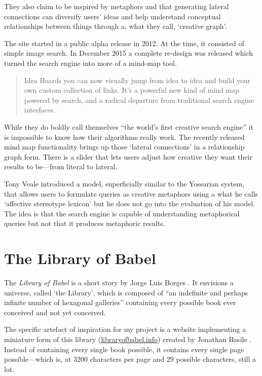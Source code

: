 They also claim to be inspired by metaphors and that generating lateral connections can diversify users' ideas and help understand conceptual relationships between things through a, what they call, `creative graph'.

The site started in a public alpha release in 2012. At the time, it consisted of simple image search. In December 2015 a complete re-design was released \autocite{YossarianEmail} which turned the search engine into more of a mind-map tool.

\begin{quotation}
  Idea Boards you can now visually jump from idea to idea and build your own custom collection of links. It's a powerful new kind of mind map powered by search, and a radical departure from traditional search engine interfaces. 
\end{quotation}

While they do boldly call themselves ``the world's first creative search engine'' \autocite{Yossarian2015} it is impossible to know how their algorithms really work. The recently released mind map functionality brings up those `lateral connections' in a relationship graph form. There is a slider that lets users adjust how creative they want their results to be---from literal to lateral.

Tony Veale introduced a model, superficially similar to the Yossarian system, that allows users to formulate queries as creative metaphors using a what he calls `affective stereotype lexicon' \autocite*{Veale2013} but he does not go into the evaluation of his model. The idea is that the search engine is capable of understanding metaphorical queries but not that it produces metaphoric results.


\section{The Library of Babel}
\label{s:babel}

The \textit{Library of Babel} is a short story by Jorge Luis Borges \autocite*{Borges1964}. It envisions a universe, called `the Library', which is composed of ``an indefinite and perhaps infinite number of hexagonal galleries'' containing every possible book ever conceived and not yet conceived.

The specific artefact of inspiration for my project is a website implementing a miniature form of this library (\url{libraryofbabel.info}) created by Jonathan Basile \autocite*{Basile2015}. Instead of containing every single book possible, it contains every single page possible---which is, at \num{3200} characters per page and \num{29} possible characters, still a lot.

